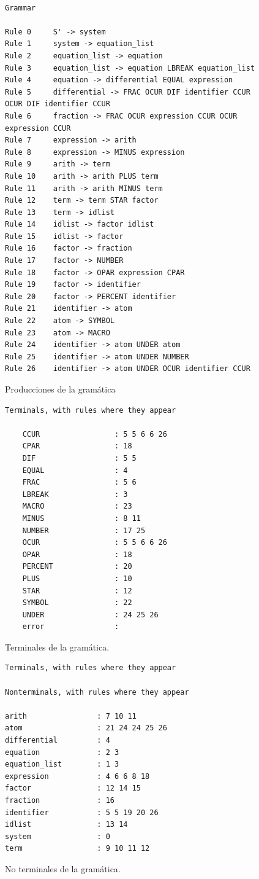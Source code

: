 \documentclass[a4paper,10pt,twocolumn]{article}
\begin{document}
\begin{figure}[H]%
	\begin{lstlisting}[breaklines=true]%
	
Grammar

Rule 0     S' -> system
Rule 1     system -> equation_list
Rule 2     equation_list -> equation
Rule 3     equation_list -> equation LBREAK equation_list
Rule 4     equation -> differential EQUAL expression
Rule 5     differential -> FRAC OCUR DIF identifier CCUR OCUR DIF identifier CCUR
Rule 6     fraction -> FRAC OCUR expression CCUR OCUR expression CCUR
Rule 7     expression -> arith
Rule 8     expression -> MINUS expression
Rule 9     arith -> term
Rule 10    arith -> arith PLUS term
Rule 11    arith -> arith MINUS term
Rule 12    term -> term STAR factor
Rule 13    term -> idlist
Rule 14    idlist -> factor idlist
Rule 15    idlist -> factor
Rule 16    factor -> fraction
Rule 17    factor -> NUMBER
Rule 18    factor -> OPAR expression CPAR
Rule 19    factor -> identifier
Rule 20    factor -> PERCENT identifier
Rule 21    identifier -> atom
Rule 22    atom -> SYMBOL
Rule 23    atom -> MACRO
Rule 24    identifier -> atom UNDER atom
Rule 25    identifier -> atom UNDER NUMBER
Rule 26    identifier -> atom UNDER OCUR identifier CCUR
	\end{lstlisting}
	\caption{Producciones de la gram\'atica}
\end{figure}


\begin{figure}[H]%
	\begin{lstlisting}[breaklines=true]%
	Terminals, with rules where they appear
	
	CCUR                 : 5 5 6 6 26
	CPAR                 : 18
	DIF                  : 5 5
	EQUAL                : 4
	FRAC                 : 5 6
	LBREAK               : 3
	MACRO                : 23
	MINUS                : 8 11
	NUMBER               : 17 25
	OCUR                 : 5 5 6 6 26
	OPAR                 : 18
	PERCENT              : 20
	PLUS                 : 10
	STAR                 : 12
	SYMBOL               : 22
	UNDER                : 24 25 26
	error                : 
	\end{lstlisting}
	\caption{Terminales de la gram\'atica.}
\end{figure}


\begin{figure}[H]%
	\begin{lstlisting}[breaklines=true]%
	Terminals, with rules where they appear
	
Nonterminals, with rules where they appear

arith                : 7 10 11
atom                 : 21 24 24 25 26
differential         : 4
equation             : 2 3
equation_list        : 1 3
expression           : 4 6 6 8 18
factor               : 12 14 15
fraction             : 16
identifier           : 5 5 19 20 26
idlist               : 13 14
system               : 0
term                 : 9 10 11 12
	\end{lstlisting}
	\caption{No terminales de la gram\'atica.}
\end{figure}
	
\end{document}
